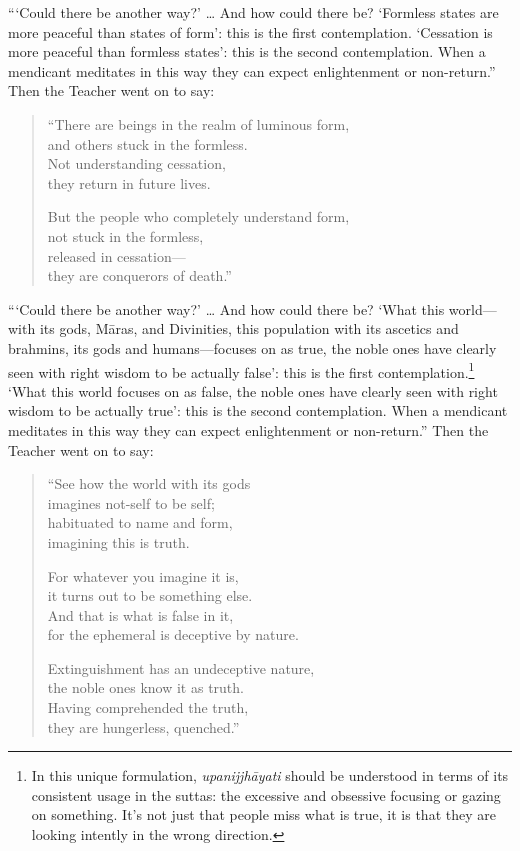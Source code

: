 \documentclass[12pt,openany]{book}%
\begin{document}
“‘Could there be another way?’ … And how could there be? ‘Formless states are more peaceful than states of form’: this is the first contemplation. ‘Cessation is more peaceful than formless states’: this is the second contemplation. When a mendicant meditates in this way they can expect enlightenment or non-return.” Then the Teacher went on to say: 

\begin{verse}%
“There are beings in the realm of luminous form, \\
and others stuck in the formless. \\
Not understanding cessation, \\
they return in future lives. 

But the people who completely understand form, \\
not stuck in the formless, \\
released in cessation—\\
they are conquerors of death.” 

%
\end{verse}

“‘Could there be another way?’ … And how could there be? ‘What this world—with its gods, \textsanskrit{Māras}, and Divinities, this population with its ascetics and brahmins, its gods and humans—focuses on as true, the noble ones have clearly seen with right wisdom to be actually false’: this is the first contemplation.\footnote{In this unique formulation, \textit{\textsanskrit{upanijjhāyati}} should be understood in terms of its consistent usage in the suttas: the excessive and obsessive focusing or gazing on something. It’s not just that people miss what is true, it is that they are looking intently in the wrong direction. } ‘What this world focuses on as false, the noble ones have clearly seen with right wisdom to be actually true’: this is the second contemplation. When a mendicant meditates in this way they can expect enlightenment or non-return.” Then the Teacher went on to say: 

\begin{verse}%
“See how the world with its gods \\
imagines not-self to be self; \\
habituated to name and form, \\
imagining this is truth. 

For whatever you imagine it is, \\
it turns out to be something else. \\
And that is what is false in it, \\
for the ephemeral is deceptive by nature. 

Extinguishment has an undeceptive nature, \\
the noble ones know it as truth. \\
Having comprehended the truth, \\
they are hungerless, quenched.” 

%
\end{verse}
\end{document}
